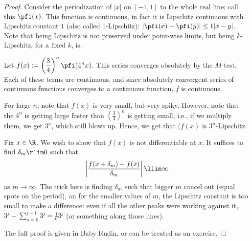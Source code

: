 \begin{proof}
	Consider the periodization of \(|x|\) on \([-1,1]\) to the whole real line; call this \(\pfi(x)\). This function is continuous, in fact it is Lipschitz continuous with Lipschitz constant \(1\) (also called 1-Lipschitz): \(|\pfi(x)-\pfi(y)|\leq 1|x-y|\). Note that being Lipschitz is not preserved under point-wise limits, but being \(k\)-Lipschitz, for a fixed \(k\), is.
	
	\medskip
	
	Let \(f(x):=\displaystyle\left(\frac{3}{4}\right)^n\pfi(4^n x)\). This series converges absolutely by the \Weierstass \(M\)-test. Each of these terms are continuous, and since absolutely convergent series of continuous functions converges to a continuous function, \(f\) is continuous.
	
	\medskip
	
	For large \(n\), note that \(f(x)\) is very small, but very spiky. However, note that the \(4^n\) is getting large faster than \(\displaystyle\left(\frac{3}{4}\right)^n\) is getting small, i.e., if we multiply them, we get \(3^n\), which still blows up. Hence, we get that \((f(x)\) is \(3^n\)-Lipschitz.
	
	\medskip
	
	Fix \(x\in\R\). We wish to show that \(f(x)\) is not differentiable at \(x\). It suffices to find \(\delta_m\rlim 0\) such that 
	\begin{equation*}
		\left|\frac{f(x+\delta_m)-f(x)}{\delta_m}\right|\llim \infty
	\end{equation*}
	as \(m\to\infty\). The trick here is finding \(\delta_m\) such that bigger \(m\) cancel out (equal spots on the period), an for the smaller values of \(m\), the Lipschitz constant is too small to make a difference: even if all the other peaks were working against it, \(3^j-\displaystyle\sum_{n=0}^{j-1}3^j=\displaystyle\frac{1}{6}3^j\) (or something along those lines).
	
	\medskip
	
	The full proof is given in Baby Rudin, or can be treated as an exercise.
\end{proof}